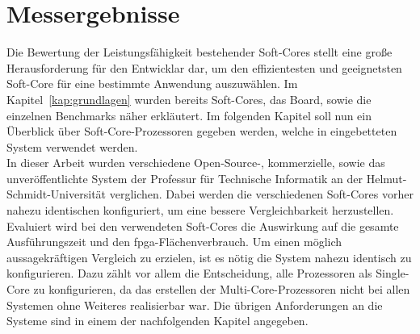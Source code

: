 %
%
%
%
%

\chapter{Messergebnisse}\label{kap:ergebnisse}
Die Bewertung der Leistungsfähigkeit bestehender Soft-Cores stellt eine große Herausforderung für den Entwicklar dar, um den effizientesten und geeignetsten Soft-Core
für eine bestimmte Anwendung auszuwählen. Im Kapitel~\ref{kap:grundlagen} wurden bereits Soft-Cores, das Board, sowie die einzelnen Benchmarks näher erkläutert. Im folgenden Kapitel
soll nun ein Überblick über Soft-Core-Prozessoren gegeben werden, welche in eingebetteten System verwendet werden. \\
In dieser Arbeit wurden verschiedene Open-Source-, kommerzielle, sowie das unveröffentlichte System der Professur für Technische Informatik an der Helmut-Schmidt-Universität verglichen.
Dabei werden die verschiedenen Soft-Cores vorher nahezu identischen konfiguriert, um eine bessere Vergleichbarkeit herzustellen. Evaluiert wird bei den verwendeten Soft-Cores
die Auswirkung auf die gesamte Ausführungszeit und den \ac{fpga}-Flächenverbrauch. Um einen möglich aussagekräftigen Vergleich zu erzielen, ist es nötig die System nahezu identisch zu
konfigurieren. Dazu zählt vor allem die Entscheidung, alle Prozessoren als Single-Core zu konfigurieren, da das erstellen der Multi-Core-Prozessoren nicht bei allen Systemen ohne Weiteres
realisierbar war. Die übrigen Anforderungen an die Systeme sind in einem der nachfolgenden Kapitel angegeben.\\

